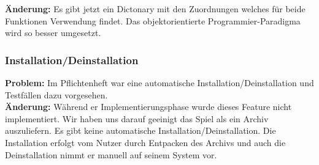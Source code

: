 \textbf{Änderung:} Es gibt jetzt ein Dictonary mit den Zuordnungen welches für beide Funktionen Verwendung findet. Das objektorientierte Programmier-Paradigma wird so besser umgesetzt.\\



\subsubsection*{Installation/Deinstallation}
\textbf{Problem:} Im Pflichtenheft war eine automatische Installation/Deinstallation und Testfällen dazu vorgesehen.\\

\textbf{Änderung:} Während er Implementierungsphase wurde dieses Feature nicht implementiert. Wir haben uns darauf geeinigt das Spiel als ein Archiv auszuliefern. Es gibt keine automatische Installation/Deinstallation. Die Installation erfolgt vom Nutzer durch Entpacken des Archivs und auch die Deinstallation nimmt er manuell auf seinem System vor.\\


